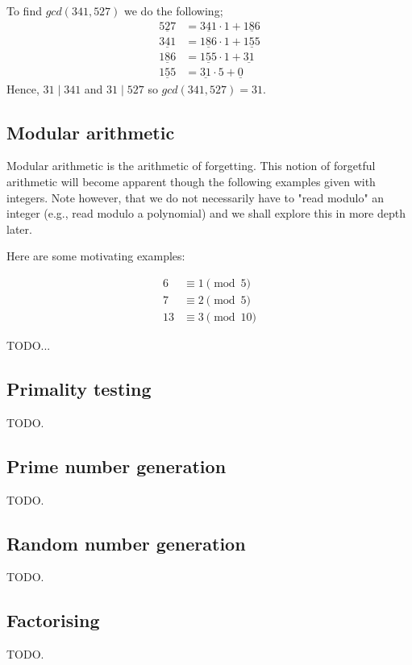 \begin{exmp}
 To find $gcd(341,527)$ we do the following;
 \begin{align*}
  \underline{527} &= \underline{341} \cdot 1 + \underline{186}
  \\
  \underline{341} &= \underline{186} \cdot 1 + \underline{155}
  \\
  \underline{186} &= \underline{155} \cdot 1 + \underline{31}
  \\
  \underline{155} &= \underline{31} \cdot 5 + \underline{0}
 \end{align*}
 Hence, $31 \mid 341$ and $31 \mid 527$ so $gcd(341,527) = 31$.
\end{exmp}


\subsection{Modular arithmetic}
Modular arithmetic is the arithmetic of forgetting.
This notion of forgetful arithmetic will become apparent though
the following examples given with integers. Note however, that we
do not necessarily have to "read modulo" an integer (e.g., read modulo a polynomial)
and we shall explore this in more depth later.

Here are some motivating examples:
\begin{exmp}
\begin{align}
 6 & \equiv 1 \pmod{5}
 \\
 7 & \equiv 2 \pmod{5}
 \\
 13 & \equiv 3 \pmod{10}
\end{align}
\end{exmp}
TODO...

\subsection{Primality testing}
TODO.

\subsection{Prime number generation}
TODO.

\subsection{Random number generation}
TODO.

\subsection{Factorising}
TODO.
